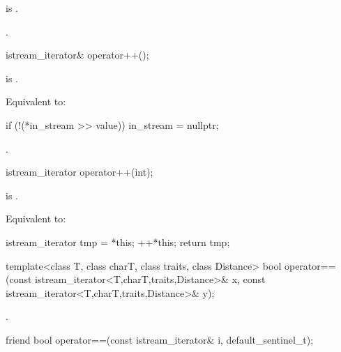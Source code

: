 \begin{itemdescr}
\pnum
\expects
{} is .

\pnum
\returns
{}.
\end{itemdescr}

%
\begin{itemdecl}
istream_iterator& operator++();
\end{itemdecl}

\begin{itemdescr}
\pnum
\expects
{} is .

\pnum
\effects
Equivalent to:
\begin{codeblock}
if (!(*in_stream >> value))
  in_stream = nullptr;
\end{codeblock}

\pnum
\returns
{}.
\end{itemdescr}

%
\begin{itemdecl}
istream_iterator operator++(int);
\end{itemdecl}

\begin{itemdescr}
\pnum
\expects
{} is .

\pnum
\effects
Equivalent to:
\begin{codeblock}
istream_iterator tmp = *this;
++*this;
return tmp;
\end{codeblock}
\end{itemdescr}

%
\begin{itemdecl}
template<class T, class charT, class traits, class Distance>
  bool operator==(const istream_iterator<T,charT,traits,Distance>& x,
                  const istream_iterator<T,charT,traits,Distance>& y);
\end{itemdecl}

\begin{itemdescr}
\pnum
\returns
{}.
\end{itemdescr}

%
\begin{itemdecl}
friend bool operator==(const istream_iterator& i, default_sentinel_t);
\end{itemdecl}

